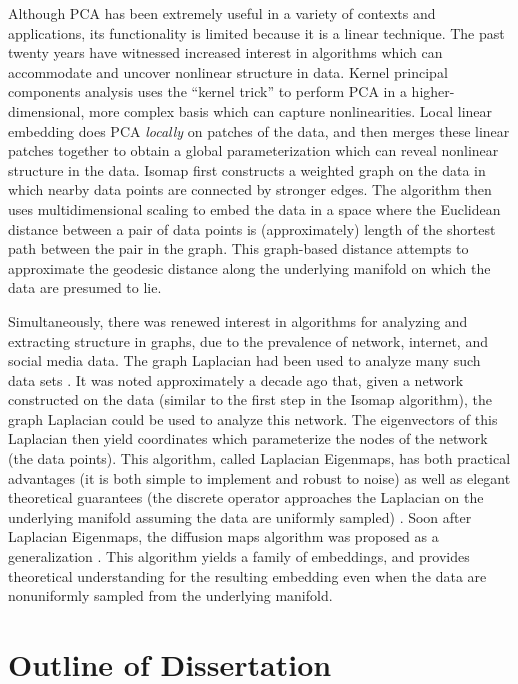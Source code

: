 Although PCA has been extremely useful in a variety of contexts and applications, its functionality is limited because it is a linear technique.
%
The past twenty years have witnessed increased interest in algorithms which can accommodate and uncover nonlinear structure in data.
%
Kernel principal components analysis \cite{scholkopf1997kernel} uses the ``kernel trick'' to perform PCA in a higher-dimensional, more complex basis which can capture nonlinearities.
%
Local linear embedding \cite{roweis2000nonlinear} does PCA {\em locally} on patches of the data, and then merges these linear patches together to obtain a global parameterization which can reveal nonlinear structure in the data.
%
Isomap \cite{tenenbaum2000global} first constructs a weighted graph on the data in which nearby data points are connected by stronger edges.
%
The algorithm then uses multidimensional scaling \cite{joseph1978multidimensional} to embed the data in a space where the Euclidean distance between a pair of data points is (approximately) length of the shortest path between the pair in the graph.
%
This graph-based distance attempts to approximate the geodesic distance along the underlying manifold on which the data are presumed to lie.

Simultaneously, there was renewed interest in algorithms for analyzing and extracting structure in graphs, due to the prevalence of network, internet, and social media data.
%
The graph Laplacian had been used to analyze many such data sets \cite{shi2000normalized, ng2002spectral}.
%
It was noted approximately a decade ago that, given a network constructed on the data (similar to the first step in the Isomap algorithm), the graph Laplacian could be used to analyze this network.
%
The eigenvectors of this Laplacian then yield coordinates which parameterize the nodes of the network (the data points).
%
This algorithm, called Laplacian Eigenmaps, has both practical advantages (it is both simple to implement and robust to noise) as well as elegant theoretical guarantees (the discrete operator approaches the Laplacian on the underlying manifold assuming the data are uniformly sampled) \cite{Belkin2003}.
%
Soon after Laplacian Eigenmaps, the diffusion maps algorithm was proposed as a generalization \cite{coifman2005geometric, coifman2006geometric}.
%
This algorithm yields a family of embeddings, and provides theoretical understanding for the resulting embedding even when the data are nonuniformly sampled from the underlying manifold.


\section{Outline of Dissertation}

